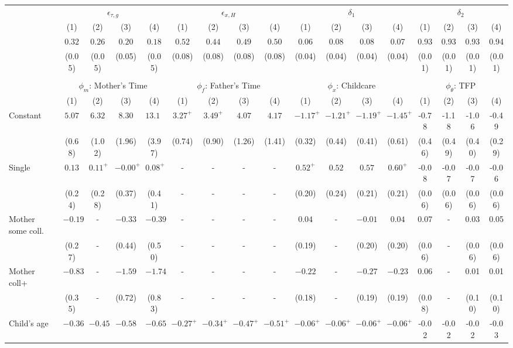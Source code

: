 \begin{tabular}{lcccccccccccccccc}\\\toprule
 & \multicolumn{4}{c}{$\epsilon_{\tau,g}$} & \multicolumn{4}{c}{$\epsilon_{x,H}$} & \multicolumn{4}{c}{$\delta_{1}$} & \multicolumn{4}{c}{$\delta_{2}$} \\
&(1)&(2)&(3)&(4)&(1)&(2)&(3)&(4)&(1)&(2)&(3)&(4)&(1)&(2)&(3)&(4)\\\cmidrule(r){2-5}\cmidrule(r){6-9}\cmidrule(r){10-13}\cmidrule(r){14-17}
&$0.32$&$0.26$&$0.20$&$0.18$&$0.52$&$0.44$&$0.49$&$0.50$&0.06&0.08&0.08&0.07&0.93&0.93&0.93&0.94\\
&(0.05)&(0.05)&(0.05)&(0.05)&(0.08)&(0.08)&(0.08)&(0.08)&(0.04)&(0.04)&(0.04)&(0.04)&(0.01)&(0.01)&(0.01)&(0.01)\\
&&&&&&&&&&&&&&&&\\
 & \multicolumn{4}{c}{$\phi_{m}$: Mother's Time} & \multicolumn{4}{c}{$\phi_{f}$: Father's Time} & \multicolumn{4}{c}{$\phi_{x}$: Childcare} & \multicolumn{4}{c}{$\phi_{\theta}$: TFP} \\
&(1)&(2)&(3)&(4)&(1)&(2)&(3)&(4)&(1)&(2)&(3)&(4)&(1)&(2)&(3)&(4)\\\cmidrule(r){2-5}\cmidrule(r){6-9}\cmidrule(r){10-13}\cmidrule(r){14-17}
Constant&$5.07$&$6.32$&$8.30$&$13.18$&$3.27^{+}$&$3.49^{+}$&$4.07$&$4.17$&$-1.17^{+}$&$-1.21^{+}$&$-1.19^{+}$&$-1.45^{+}$&-0.78&-1.18&-1.06&-0.49\\
&(0.68)&(1.02)&(1.96)&(3.97)&(0.74)&(0.90)&(1.26)&(1.41)&(0.32)&(0.44)&(0.41)&(0.61)&(0.46)&(0.49)&(0.40)&(0.29)\\
Single&$0.13$&$0.11^{+}$&$-0.00^{+}$&$0.08^{+}$&-&-&-&-&$0.52^{+}$&$0.52$&$0.57$&$0.60^{+}$&-0.08&-0.07&-0.07&-0.06\\
&(0.24)&(0.28)&(0.37)&(0.41)&-&-&-&-&(0.20)&(0.24)&(0.21)&(0.21)&(0.06)&(0.06)&(0.06)&(0.06)\\
Mother some coll.&$-0.19$&-&$-0.33$&$-0.39$&-&-&-&-&$0.04$&-&$-0.01$&$0.04$&0.07&-&0.03&0.05\\
&(0.27)&-&(0.44)&(0.50)&-&-&-&-&(0.19)&-&(0.20)&(0.20)&(0.06)&-&(0.06)&(0.06)\\
Mother coll+&$-0.83$&-&$-1.59$&$-1.74$&-&-&-&-&$-0.22$&-&$-0.27$&$-0.23$&0.06&-&0.01&0.01\\
&(0.35)&-&(0.72)&(0.83)&-&-&-&-&(0.18)&-&(0.19)&(0.19)&(0.08)&-&(0.10)&(0.10)\\
Child's age&$-0.36$&$-0.45$&$-0.58$&$-0.65$&$-0.27^{+}$&$-0.34^{+}$&$-0.47^{+}$&$-0.51^{+}$&$-0.06^{+}$&$-0.06^{+}$&$-0.06^{+}$&$-0.06^{+}$&-0.02&-0.02&-0.02&-0.03\\

\end{tabular}
